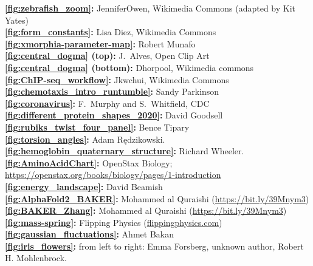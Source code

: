 \textbf{\autoref{fig:zebrafish_zoom}:} JenniferOwen, Wikimedia Commons (adapted by Kit Yates)\\
\textbf{\autoref{fig:form_constants}:} Lisa Diez, Wikimedia Commons\\
\textbf{\autoref{fig:xmorphia-parameter-map}:} Robert Munafo\\
\textbf{\autoref{fig:central_dogma} (top):} J.~Alves, Open Clip Art\\
\textbf{\autoref{fig:central_dogma} (bottom):} Dhorpool, Wikimedia commons\\
\textbf{\autoref{fig:ChIP-seq_workflow}:} Jkwchui, Wikimedia Commons\\
\textbf{\autoref{fig:chemotaxis_intro_runtumble}:} Sandy Parkinson\\
\textbf{\autoref{fig:coronavirus}:} F.~Murphy and S.~Whitfield, CDC\\
\textbf{\autoref{fig:different_protein_shapes_2020}:} David Goodsell\\
\textbf{\autoref{fig:rubiks_twist_four_panel}:} Bence Tipary\\
\textbf{\autoref{fig:torsion_angles}:} Adam Rędzikowski.\\
\textbf{\autoref{fig:hemoglobin_quaternary_structure}:} Richard Wheeler.\\
\textbf{\autoref{fig:AminoAcidChart}:} OpenStax Biology; \url{https://openstax.org/books/biology/pages/1-introduction}\\
\textbf{\autoref{fig:energy_landscape}:} David Beamish\\
\textbf{\autoref{fig:AlphaFold2_BAKER}:} Mohammed al Quraishi (\url{https://bit.ly/39Mnym3})\\
\textbf{\autoref{fig:BAKER_Zhang}:} Mohammed al Quraishi (\url{https://bit.ly/39Mnym3})\\
\textbf{\autoref{fig:mass-spring}:} Flipping Physics (\url{flippingphysics.com})\\
\textbf{\autoref{fig:gaussian_fluctuations}:} Ahmet Bakan\\
\textbf{\autoref{fig:iris_flowers}:} from left to right: Emma Forsberg, unknown author, Robert H. Mohlenbrock.\\



\clearpage
\thispagestyle{empty}
\phantom{}
